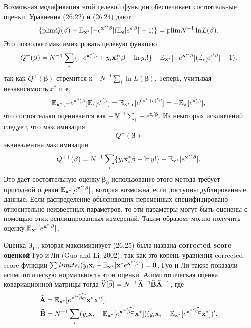 Возможная модификация этой целевой функции обеспечивает состоятельные оценки. Уравнения (26.22) и (26.24) дают
\[
\{ \mathrm{plim } Q(\mathbf{\beta})-\mathbb{E}_{\mathbf{x^*}} [-e^{\mathbf{x^*}' \mathbf{\beta}}](\mathbb{E}_{\epsilon}[e^{\mathbf{\epsilon}' \mathbf{\beta}}]-1) \} = \mathrm{plim } N^{-1}\ln L(\mathbf{\beta}).
\]
Это позволяет максимизировать целевую функцию
\[
Q^+(\mathbf{\beta})=N^{-1} \sum \limits_i \{ -e^{\mathbf{x}^{*\prime}_i \mathbf{\beta}} + y_i \mathbf{x}^{*\prime}_i \mathbf{\beta} - \ln y_i! \} - \mathbb{E}_{\mathbf{x^*}} [-e^{\mathbf{x^{*\prime}} \mathbf{\beta}}](\mathbb{E}_{\epsilon}[e^{\mathbf{\epsilon}' \mathbf{\beta}}]-1),
\]
так как $Q^+(\mathbf{\beta})$ стремится к $-N^{-1} \sum \limits_i \ln L(\mathbf{\beta})$. Теперь, учитывая независимость $x^*$ и $\mathbf{\epsilon}$,
\[
\mathbb{E}_{\mathbf{x^*}}[ -e^{\mathbf{x^*}'_i \mathbf{\beta}}]\mathbb{E}_{\epsilon}[e^{\mathbf{\epsilon}' \mathbf{\beta}}] = \mathbb{E}_{\mathbf{x^*},\epsilon}[e^{(\mathbf{x^*}+\mathbf{\epsilon})' \mathbf{\beta}}]=-\mathbb{E}_{\mathbf{x}}[e^{\mathbf{x}'_i \mathbf{\beta}}],
\]
что состоятельно оценивается как $-N^{-1} \sum \limits_i -e^{\mathbf{x}_i' \mathbf{\beta}}$. Из некоторых исключений следует, что максимизация $$Q^+(\mathbf{\beta})$$ эквивалентна максимизации
\begin{equation}
Q^{++}(\mathbf{\beta})=N^{-1} \sum \limits_i \{ y_i \mathbf{x}^*_i \mathbf{\beta} - \ln y! \} - \mathbb{E}_{\mathbf{x^*}} [e^{\mathbf{x^*}' \mathbf{\beta}}].
\end{equation}
Это даёт состоятельную оценку $\mathbf{\beta}_0$ использование этого метода требует пригодной оценки $\mathbb{E}_{\mathbf{x}^*}[ e^{\mathbf{x}^{*\prime} \mathbf{\beta}}]$, которая возможна, если доступны дублированные данные. Если распределение объясняющих переменных специфицировано относительно неизвестных параметров, то эти параметры могут быть оценены с помощью этих реплицированных измерений. Таким образом, можно получить оценку $\mathbb{E}_{\mathbf{x}^*}[ e^{\mathbf{x}^{*\prime} \mathbf{\beta}}]$.

Оценка $\mathbf{\beta_C}$, которая максимизирует (26.25) была названа {\bf corrected score оценкой} Гуо и Ли (Guo and Li, 2002), так как это корень уравнения corrected score функции $\sum ]limits_i (y_i \mathbf{x}_i- \mathbb{E}_{\mathbf{x^*}}[\mathbf{x^*}e^{\mathbf{x^*}'\mathbf{\beta}}])=\mathbf{0}$. Гуо и Ли также показали асимптотическую нормальность этой оценки. Асимптотическая оценка ковариационной матрицы тогда $\widehat{\mathrm{V}}[\widehat{\mathbf{\beta}}]=N^{-1} \widehat{\mathbf{A}}^{-1}\widehat{\mathbf{B}}\widehat{\mathbf{A}}^{-1}$, где 
\begin{align*}
\widehat{\mathbf{A}}&=\mathbb{E}_{\mathbf{x^*}}[e^{\mathbf{x}^{*\prime} \widehat{\mathbf{\beta_C}}} \mathbf{x^*} \mathbf{x^*}'], \\
\widehat{\mathbf{B}}&=N^{-1} \sum \limits_i (y_i \mathbf{x}_i - \mathbb{E}_{\mathbf{x^*}}[e^{\mathbf{x}^{*\prime} \widehat{\mathbf{\beta_C}}} \mathbf{x^*}]) (y_i \mathbf{x}_i - \mathbb{E}_{\mathbf{x^*}}[e^{\mathbf{x}^{*\prime} \widehat{\mathbf{\beta_C}}} \mathbf{x^*}])'.
\end{align*}

